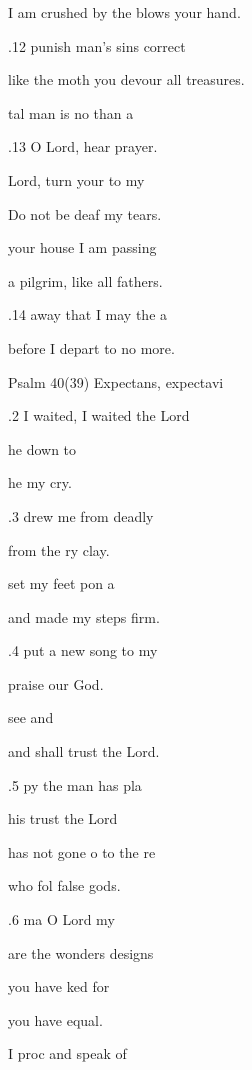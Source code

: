 I am crushed by the blows  your hand. 

.12  punish man's sins  correct  

like the moth you devour all  treasures. 

tal man is no  than a  

.13 O Lord, hear  prayer. 

 Lord, turn your  to my  

Do not be deaf  my tears. 

 your house I am  passing  

a pilgrim, like all  fathers. 

.14  away that I may the a 

before I depart to  no more. 

Psalm 40(39) Expectans, expectavi 


.2 I waited, I waited  the Lord 

 he  down to  

he  my cry. 

.3  drew me from  deadly  

from the ry clay. 

 set my feet pon a  

and made my steps firm. 

.4  put a new song to my  

praise  our God. 

  see and  

and shall trust  the Lord. 

.5 py the man  has pla 

his trust  the Lord 

 has not gone o to the re 

who fol false gods. 

.6  ma O Lord my  

are the wonders  designs 

 you have ked for  

you have  equal. 

 I proc and speak of  

